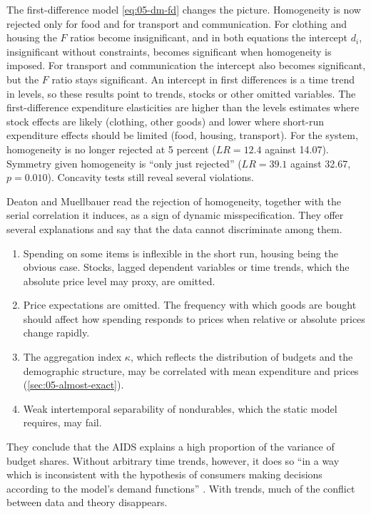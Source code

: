 The first-difference model \eqref{eq:05-dm-fd} changes the picture. Homogeneity is now rejected only for
food and for transport and communication. For clothing and housing the $F$ ratios become insignificant,
and in both equations the intercept $d_i$, insignificant without constraints, becomes significant when
homogeneity is imposed. For transport and communication the intercept also becomes significant, but the
$F$ ratio stays significant. An intercept in first differences is a time trend in levels, so these
results point to trends, stocks or other omitted variables. The first-difference expenditure
elasticities are higher than the levels estimates where stock effects are likely (clothing, other goods)
and lower where short-run expenditure effects should be limited (food, housing, transport). For the
system, homogeneity is no longer rejected at 5 percent ($LR = 12.4$ against 14.07). Symmetry given
homogeneity is ``only just rejected'' ($LR = 39.1$ against 32.67, $p = 0.010$). Concavity tests still
reveal several violations.

Deaton and Muellbauer read the rejection of homogeneity, together with the serial correlation it
induces, as a sign of dynamic misspecification. They offer several explanations and say that the data
cannot discriminate among them.
\begin{enumerate}[label=(\roman*)]
  \item Spending on some items is inflexible in the short run, housing being the obvious case. Stocks,
  lagged dependent variables or time trends, which the absolute price level may proxy, are omitted.
  \item Price expectations are omitted. The frequency with which goods are bought should affect how
  spending responds to prices when relative or absolute prices change rapidly.
  \item The aggregation index $\kappa$, which reflects the distribution of budgets and the demographic
  structure, may be correlated with mean expenditure and prices (\cref{sec:05-almost-exact}).
  \item Weak intertemporal separability of nondurables, which the static model requires, may fail.
\end{enumerate}
They conclude that the AIDS explains a high proportion of the variance of budget shares. Without
arbitrary time trends, however, it does so ``in a way which is inconsistent with the hypothesis of
consumers making decisions according to the model's demand functions''
\citep[pp.~322--323]{DeatonMuellbauer1980a}. With trends, much of the conflict between data
and theory disappears.

